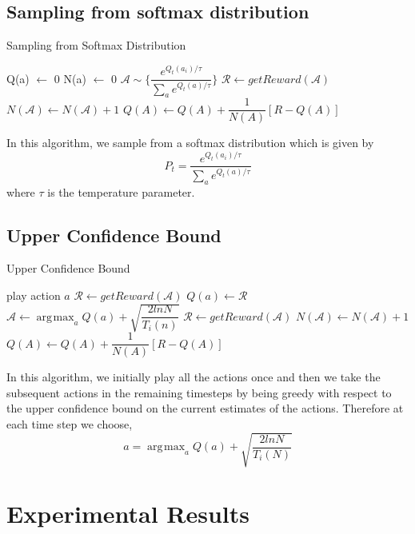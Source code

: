 \documentclass[english]{article}
\DeclareMathOperator*{\argmax}{\arg\!\max}
\begin{document}
\subsection{Sampling from softmax distribution}
\begin{algorithm}[H]
\caption{Sampling from Softmax Distribution}
\label{SoftmaxAlgorithm}
\begin{algorithmic}[2]
\State Q(a) $\leftarrow$ 0
\State N(a) $\leftarrow$ 0
\EndFor
\Loop
	\State $\mathcal{A} \sim \{\dfrac{e^{Q_{t}(a_{i})/\tau}}{\sum_{a}e^{Q_{t}(a)/\tau}}\}$
	\State $\mathcal{R} \leftarrow getReward(\mathcal{A})$
	\State $N(\mathcal{A}) \leftarrow N(\mathcal{A}) + 1$
	\State $Q(A) \leftarrow Q(A) + \dfrac{1}{N(A)}[R - Q(A)]$
\EndLoop
\EndProcedure
\end{algorithmic}
\end{algorithm}
In this algorithm, we sample from a softmax distribution which is given by $$ P_{t} = \dfrac{e^{Q_{t}(a_{i})/\tau}}{\sum_{a}e^{Q_{t}(a)/\tau}} $$ where $\tau$ is the temperature parameter.

\subsection{Upper Confidence Bound}
\begin{algorithm}[H]
\caption{Upper Confidence Bound}
\label{UCBAlgorithm}
\begin{algorithmic}[1]
\State play action $a$
\State $\mathcal{R} \leftarrow getReward(\mathcal{A})$
\State $Q(a) \leftarrow \mathcal{R}$
\EndFor
\Loop
	\State $\mathcal{A} \leftarrow \argmax_{a} Q(a) + \sqrt{\dfrac{2lnN}{T_{i}(n)}}$
	\State $\mathcal{R} \leftarrow getReward(\mathcal{A})$
	\State $N(\mathcal{A}) \leftarrow N(\mathcal{A}) + 1$
	\State $Q(A) \leftarrow Q(A) + \dfrac{1}{N(A)}[R - Q(A)]$
\EndLoop
\EndProcedure
\end{algorithmic}
\end{algorithm}
In this algorithm, we initially play all the actions once and then we take the subsequent actions in the remaining timesteps by being greedy with respect to the upper confidence bound on the current estimates of the actions. Therefore at each time step we choose,
$$ a = \argmax_{a} Q(a) + \sqrt{\dfrac{2lnN}{T_{i}(N)}} $$

\section{Experimental Results}
\end{document}
